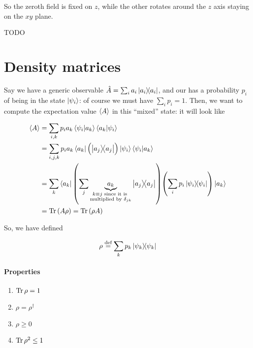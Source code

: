 \documentclass[main.tex]{subfiles}
\begin{document}
So the zeroth field is fixed on \(z\), while the other rotates around the \(z\) axis staying on the \(xy\) plane.

\begin{greenbox}
  TODO
\end{greenbox}

\section{Density matrices}

Say we have a generic observable \(\hat{A} = \sum _{i}  a_i \dyad{a_i} \), and our has a probability \(p_i\) of being in the state \(\ket{\psi_i}\): of course we must have \(\sum _{i}  p_i = 1 \). Then, we want to compute the expectation value \(\expval{A} \) in this ``mixed'' state: it will look like

\begin{subequations}
\begin{align}
   \expval{A} &= \sum _{i,k} p_i a_k \braket{\psi_i}{a_k}\braket{a_k}{\psi_i}   \\
   &= \sum _{i,j,k}  p_i a_k  \bra{a_k}\qty(\ketbra{a_j}{a_j})\ket{\psi_i} \braket{\psi_i}{a_k}  \\
   &= \sum _{k} \bra{a_k} \qty(\sum_j \underbrace{a_k}_{\substack{k\equiv j\text{ since it is }\\ \text{multiplied by }\delta_{jk}}}  \dyad{a_j} ) \qty(\sum_i p_i \dyad{\psi_i} ) \ket{a_k} \\
   &= \Tr \qty(A \rho) = \Tr \qty(\rho A)
\end{align}
\end{subequations}

So, we have defined

\begin{equation}
    \rho \defeq \sum _{k} p_k  \dyad{\psi_k}
\end{equation}

\paragraph{Properties}

\begin{enumerate}
    \item \(\operatorname*{Tr} \rho = 1\)
    \item \(\rho = \rho^\dag\)
    \item \(\rho \geq 0\)
    \item \(\operatorname*{Tr} \rho^2 \leq 1\)
\end{enumerate}
\end{document}
